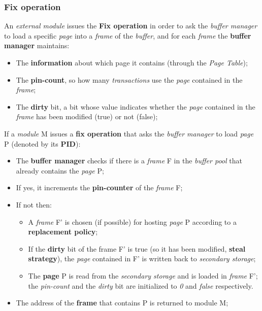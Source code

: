 \documentclass{article}
\begin{document}
\subsubsection{Fix operation}
An \emph{external module} issues the \textbf{Fix operation} in order to ask the \emph{buffer manager} to load a specific \emph{page} into a \emph{frame} of the \emph{buffer}, and for each \emph{frame} the \textbf{buffer manager} maintains:
\begin{itemize}
\item The \textbf{information} about which page it contains (through the \emph{Page Table});
\item The\textbf{ pin-count}, so how many \emph{transactions} use the \emph{page} contained in the \emph{frame};
\item The \textbf{dirty} bit, a bit whose value indicates whether the \emph{page} contained in the \emph{frame} has been modified (true) or not (false);
\end{itemize}
If a \emph{module} M issues a\textbf{ fix operation} that asks the \emph{buffer manager} to load \emph{page} P (denoted by its \textbf{PID}):
\begin{itemize}
\item The \textbf{buffer manager} checks if there is a \emph{frame} F in the \emph{buffer pool} that already contains the \emph{page} P;
\item If yes, it increments the \textbf{pin-counter} of the \emph{frame} F;
\item If not then:
\begin{itemize}
\item A \emph{frame} F' is chosen (if possible) for hosting \emph{page} P according to a \textbf{replacement policy};
\item If the \textbf{dirty} bit of the frame F' is true (so it has been modified, \textbf{steal strategy}), the \emph{page} contained in F' is written back to \emph{secondary storage};
\item The \textbf{page} P is read from the\emph{ secondary storage} and is loaded in \emph{frame} F'; the \emph{pin-count} and the \emph{dirty }bit are initialized to\emph{ 0 }and \emph{false} respectively. 
\end{itemize}
\item The address of the \textbf{frame} that contains P is returned to module M;
\end{itemize}
\newpage
\end{document}
